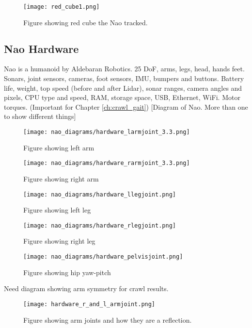 \begin{figure}
  \centering
  \texttt{[image: red\_cube1.png]}
  \caption{Figure showing red cube the Nao tracked.}
  \label{fig:nao_arm_joints_reflect1}
\end{figure}

\subsection{Nao Hardware}
Nao is a humanoid by Aldebaran Robotics. 25 DoF, arms, legs, head, hands feet. Sonars, joint sensors, cameras,
foot sensors, IMU, bumpers and buttons. Battery life, weight, top speed (before and after Lidar), sonar ranges, camera angles and pixels,
CPU type and speed, RAM, storage space, USB, Ethernet, WiFi.
Motor torques. (Important for Chapter \ref{ch:crawl_gait})
[Diagram of Nao. More than one to show different things]

\begin{figure}
  \centering
  \texttt{[image: nao\_diagrams/hardware\_larmjoint\_3.3.png]}
  \caption{Figure showing left arm}
  \label{fig:nao_arm_joints_left1}
\end{figure}

\begin{figure}
  \centering
  \texttt{[image: nao\_diagrams/hardware\_rarmjoint\_3.3.png]}
  \caption{Figure showing right arm}
  \label{fig:nao_arm_joints_right1}
\end{figure}

\begin{figure}
  \centering
  \texttt{[image: nao\_diagrams/hardware\_llegjoint.png]}
  \caption{Figure showing left leg}
  \label{fig:nao_leg_joints_left1}
\end{figure}

\begin{figure}
  \centering
  \texttt{[image: nao\_diagrams/hardware\_rlegjoint.png]}
  \caption{Figure showing right leg}
  \label{fig:nao_leg_joints_right1}
\end{figure}

\begin{figure}
  \centering
  \texttt{[image: nao\_diagrams/hardware\_pelvisjoint.png]}
  \caption{Figure showing hip yaw-pitch}
  \label{fig:nao_hip_yawpitch1}
\end{figure}


Need diagram showing arm symmetry for crawl results. 
\begin{figure}
  \centering
  \texttt{[image: hardware\_r\_and\_l\_armjoint.png]}
  \caption{Figure showing arm joints and how they are a reflection.}
  \label{fig:nao_arm_joints_reflect1}
\end{figure}

